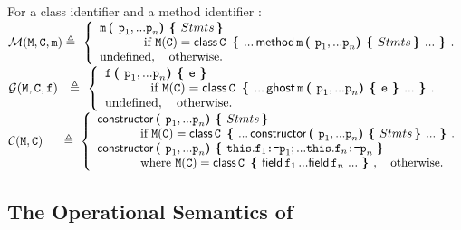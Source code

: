  \begin{definition}[Lookup] For a class identifier   and a method identifier $:$  $ ~ $ \\
\label{def:lookup}
\noindent
$
{\mathcal M}({\mbox{\tt{\ensuremath{{\mbox{\tt{M}}}}}}}{},{\mbox{\tt{{\mbox{\tt{C}}}}}}, {\mbox{\tt{m}}})       \triangleq  \ \left\{
\begin{array}{l}
                        {\mbox{\tt{m}}}\, {\mbox{\tt{\mbox{\tt{\bf{( }}}}}} {\mbox{\tt{p}}}_1, ... {\mbox{\tt{p}}}_n {\mbox{\tt{\mbox{\tt{\bf{) }}}}}} {\mbox{\tt{\mbox{\tt{\bf{\{ }}}}}} Stmts\, {\mbox{\tt{\mbox{\tt{\bf{\} }}}}}}\\
\hspace{0.5in} \mbox{if}\  {\mbox{\tt{\ensuremath{{\mbox{\tt{M}}}}}}}({\mbox{\tt{C}}}) =   {\bf{\sf {class}}}\, {\mbox{\tt{C}}}\, \  {\mbox{\tt{\mbox{\tt{\bf{\{ }}}}}} ...\,   {\bf{\sf {method}}}\, {\mbox{\tt{m}}}\, {\mbox{\tt{\mbox{\tt{\bf{( }}}}}} {\mbox{\tt{p}}}_1, ... {\mbox{\tt{p}}}_n {\mbox{\tt{\mbox{\tt{\bf{) }}}}}} {\mbox{\tt{\mbox{\tt{\bf{\{ }}}}}} Stmts\,  {\mbox{\tt{\mbox{\tt{\bf{\} }}}}}}  ... \ {\mbox{\tt{\mbox{\tt{\bf{\} }}}}}}.
\\
\mbox{undefined},  \ \ \ \mbox{otherwise.}
\end{array}
                    \right.$
\\
$
{\mathcal G} (\M, {\prg{C}}, {\f})    \ \   \triangleq  \ \left\{
\begin{array}{l}
                        \f\, \lp \p_1, ... \p_n \rp \lb \prg{e}\  \rb\\
\hspace{0.5in} \mbox{if}\  \M(\prg{C}) =   \kwN{class}\, \prg{C}\, \  \lb ...\,   \kwN{ghost}\,  \m\, \lp \p_1, ... \p_n \rp \lb \prg{e} \  \rb  ... \ \rb.
\\
\mbox{undefined},  \ \ \ \mbox{otherwise.}
\end{array}
                    \right.$
\\
$
{\mathcal C} (\M, {\prg{C}})   \quad \ \,   \triangleq  \ \left\{
\begin{array}{l}
                        \kwN{constructor} \, \lp \p_1, ... \p_n \rp \lb Stmts\, \rb\\
\hspace{0.5in} \mbox{if}\  \M(\prg{C}) =   \kwN{class}\, \prg{C}\, \  \lb ... \, \kwN{constructor} \, \lp \p_1, ... \p_n \rp \lb Stmts\, \rb ... \ \rb.
\\
\kwN{constructor} \, \lp \p_1, ... \p_n \rp \lb \prg{this}.\f_1 \kw{:=} \p_1; ... \prg{this}.\f_n \kw{:=} \p_n\ \rb\\
\hspace{0.5in} \mbox{where}\  \M(\prg{C}) =   \kwN{class}\, \prg{C}\, \  \lb \kwN{field}\, \f_1\, ... \kwN{field}\, \f_n\ ... \ \rb,  \ \ \ \mbox{otherwise.}
\end{array}
                    \right.$
  \end{definition}

\subsection{The Operational Semantics of \LangOO}
\label{formal:semantics}

